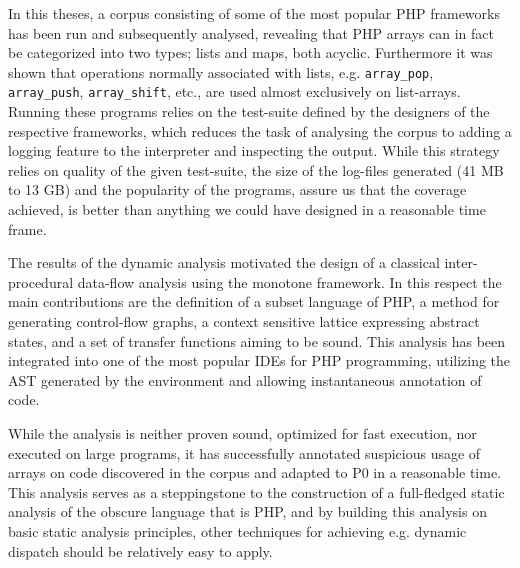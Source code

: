 

In this theses, a corpus consisting of some of the most popular PHP frameworks has been run and subsequently analysed, revealing that PHP arrays can in fact be categorized into two types; lists and maps, both acyclic. Furthermore it was shown that operations normally associated with lists, e.g. \texttt{array\_pop}, \texttt{array\_push}, \texttt{array\_shift}, etc., are used almost exclusively on list-arrays. Running these programs relies on the test-suite defined by the designers of the respective frameworks, which reduces the task of analysing the corpus to adding a logging feature to the interpreter and inspecting the output. While this strategy relies on quality of the given test-suite, the size of the log-files generated (41 MB to 13 GB) and the popularity of the programs, assure us that the coverage achieved, is better than anything we could have designed in a reasonable time frame.


The results of the dynamic analysis motivated the design of a classical inter-procedural data-flow analysis using the monotone framework. In this respect the main contributions are the definition of a subset language of PHP, a method for generating control-flow graphs, a context sensitive lattice expressing abstract states, and a set of transfer functions aiming to be sound. This analysis has been integrated into one of the most popular IDEs for PHP programming, utilizing the AST generated by the environment and allowing instantaneous annotation of code. 

While the analysis is neither proven sound, optimized for fast execution, nor executed on large programs, it has successfully annotated suspicious usage of arrays on code discovered in the corpus and adapted to P0 in a reasonable time. This analysis serves as a steppingstone to the construction of a full-fledged static analysis of the obscure language that is PHP, and by building this analysis on basic static analysis principles, other techniques for achieving e.g. dynamic dispatch should be relatively easy to apply. 






